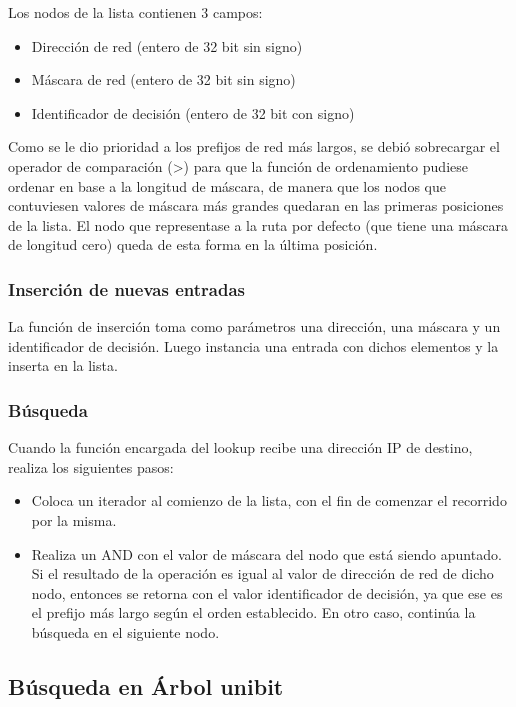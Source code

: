 Los nodos de la lista contienen 3 campos:

\begin{itemize}
	\item Dirección de red (entero de 32 bit sin signo)
	\item Máscara de red (entero de 32 bit sin signo)
	\item Identificador de decisión (entero de 32 bit con signo)
\end{itemize}

Como se le dio prioridad a los prefijos de red más largos, se debió sobrecargar el operador de comparación (\textgreater) para que la función de ordenamiento pudiese ordenar en base a la longitud de máscara, de manera que los nodos que contuviesen valores de máscara más grandes quedaran en las primeras posiciones de la lista. El nodo que representase a la ruta por defecto (que tiene una máscara de longitud cero) queda de esta forma en la última posición.

\subsubsection{Inserción de nuevas entradas}

La función de inserción toma como parámetros una dirección, una máscara y un identificador de decisión. Luego instancia una entrada con dichos elementos y la inserta en la lista.

\subsubsection{Búsqueda}

Cuando la función encargada del lookup recibe una dirección IP de destino, realiza los siguientes pasos:

\begin{itemize}
	\item Coloca un iterador al comienzo de la lista, con el fin de comenzar el recorrido por la misma.
	\item Realiza un AND con el valor de máscara del nodo que está siendo apuntado. Si el resultado de la operación es igual al valor de dirección de red de dicho nodo, entonces se retorna con el valor identificador de decisión, ya que ese es el prefijo más largo según el orden establecido. En otro caso, continúa la búsqueda en el siguiente nodo.
\end{itemize}

\subsection {Búsqueda en Árbol unibit}

